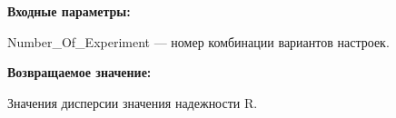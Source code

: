 \textbf{Входные параметры:}

Number\_Of\_Experiment --- номер комбинации вариантов настроек.

\textbf{Возвращаемое значение:}

Значения дисперсии значения надежности R.
